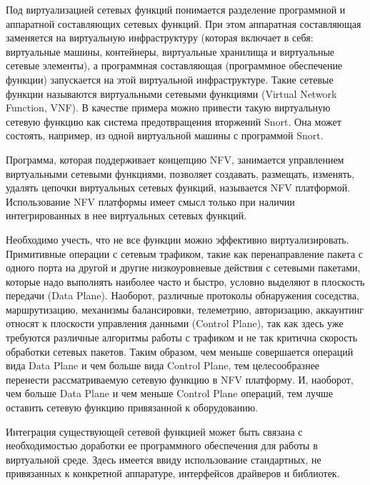 \documentclass[oneside,final,14pt,a4paper]{extreport}
\begin{document}
Под виртуализацией сетевых функций понимается разделение программной и аппаратной составляющих сетевых функций. При этом аппаратная составляющая заменяется на виртуальную инфраструктуру (которая включает в себя: виртуальные машины, контейнеры, виртуальные хранилища и виртуальные сетевые элементы), а программная составляющая (программное обеспечение функции) запускается на этой виртуальной инфраструктуре. Такие сетевые функции называются виртуальными сетевыми функциями (Virtual Network Function, VNF). В качестве примера можно привести такую виртуальную сетевую функцию как система предотвращения вторжений Snort\cite{bib:snort}. Она может состоять, например, из одной виртуальной машины с программой Snort.

Программа, которая поддерживает концепцию NFV, занимается управлением виртуальными сетевыми функциями, позволяет создавать, размещать, изменять, удалять цепочки виртуальных сетевых функций, называется NFV платформой. Использование NFV платформы имеет смысл только при наличии интегрированных в нее виртуальных сетевых функций.

Необходимо учесть, что не все функции можно эффективно виртуализировать. Примитивные операции с сетевым трафиком, такие как перенаправление пакета с одного порта на другой и другие низкоуровневые действия с сетевыми пакетами, которые надо выполнять наиболее часто и быстро, условно выделяют в плоскость передачи (Data Plane). Наоборот, различные протоколы обнаружения соседства, маршрутизацию, механизмы балансировки, телеметрию, авторизацию, аккаунтинг относят к плоскости управления данными (Control Plane), так как здесь уже требуются различные алгоритмы работы с трафиком и не так критична скорость обработки сетевых пакетов. Таким образом, чем меньше совершается операций вида Data Plane и чем больше вида Control Plane, тем целесообразнее перенести рассматриваемую сетевую функцию в NFV платформу. И, наоборот, чем больше Data Plane и чем меньше Control Plane операций, тем лучше оставить сетевую функцию привязанной к оборудованию.

Интеграция существующей сетевой функцией может быть связана с необходимостью доработки ее программного обеспечения для работы в виртуальной среде. Здесь имеется ввиду использование стандартных, не привязанных к конкретной аппаратуре, интерфейсов драйверов и библиотек.
\end{document}
